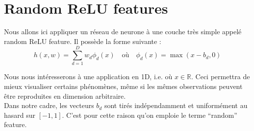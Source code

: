 \documentclass[12pt,a4paper]{article}
\begin{document}
\section{Random ReLU features}

Nous allons ici appliquer un réseau de neurone à une couche très simple appelé random ReLU feature.  
Il possède la forme suivante :
\begin{equation}
h(x, w) = \sum_{d=1}^D w_d \phi_d(x) \quad \text{où} \quad \phi_d(x) = \max(x - b_d, 0)
\end{equation}

Nous nous intéresserons à une application en 1D, i.e. où $x \in \mathbb{R}$.
Ceci permettra de mieux visualiser certains phénomènes, même si les mêmes observations peuvent être reproduites en dimension arbitraire.\\  
Dans notre cadre, les vecteurs $b_d$ sont tirés indépendamment et uniformément au hasard sur $[-1, 1]$. C’est pour cette raison qu’on emploie le terme “random” feature.
\end{document}
